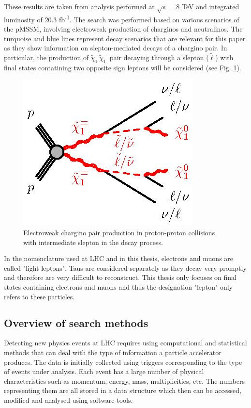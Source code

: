 These results are taken from \citep{atlas2015search} analysis performed at $\sqrt{s}=$8 TeV and integrated luminosity of 20.3 fb\textsuperscript{-1}. The search was performed based on various scenarios of the pMSSM, involving electroweak production of charginos and neutralinos. The turquoise and blue lines represent decay scenarios that are relevant for this paper as they show information on slepton-mediated decays of a chargino pair. 
In particular, the production of $\tilde{\chi}^{+}_{1}\tilde{\chi}^{-}_{1}$ pair decaying through a slepton ($\tilde{\ell}$) with final states contatining two opposite sign leptons will be considered (see Fig. \ref{fig:EWchargino}). 
\begin{figure}[!h]
  \centering   	
  	\captionsetup{width=0.8\textwidth}
	\includegraphics[]{Chap2/C1C1-llvvN1N1-slsnu}	
\caption[Feynman diagram of slepton-mediated chargino decay]{Electroweak chargino pair production in proton-proton collisions with intermediate slepton in the decay process.}\label{fig:EWchargino}
\end{figure}  

In the nomenclature used at LHC and in this thesis, electrons and muons are called "light leptons". Taus are considered separately as they decay very promptly and therefore are very difficult to reconstruct. This thesis only focuses on final states containing electrons and muons and thus the designation "lepton" only refers to these particles.  



\subsection{Overview of search methods}
Detecting new physics events at LHC requires using computational and statistical methods that can deal with the type of information a particle accelerator produces. The data is initially collected using triggers corresponding to the type of events under analysis. Each event has a large number of physical characteristics such as momentum, energy, mass, multiplicities, etc. The numbers representing them are all stored in a data structure which then can be accessed, modified and analysed using software tools. 

